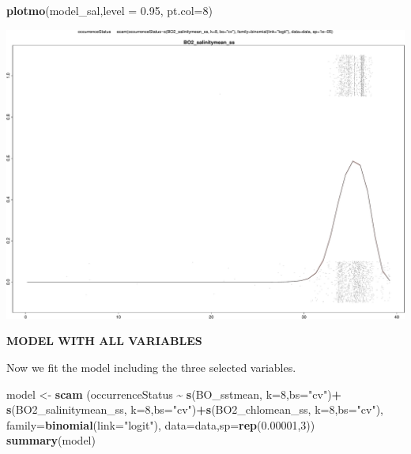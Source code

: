 \documentclass[
]{book}
\newenvironment{Shaded}{\begin{snugshade}}{\end{snugshade}}
\newcommand{\AttributeTok}[1]{\textcolor[rgb]{0.13,0.29,0.53}{#1}}
\newcommand{\DecValTok}[1]{\textcolor[rgb]{0.00,0.00,0.81}{#1}}
\newcommand{\FloatTok}[1]{\textcolor[rgb]{0.00,0.00,0.81}{#1}}
\newcommand{\FunctionTok}[1]{\textcolor[rgb]{0.13,0.29,0.53}{\textbf{#1}}}
\newcommand{\NormalTok}[1]{#1}
\newcommand{\OtherTok}[1]{\textcolor[rgb]{0.56,0.35,0.01}{#1}}
\newcommand{\SpecialCharTok}[1]{\textcolor[rgb]{0.81,0.36,0.00}{\textbf{#1}}}
\newcommand{\StringTok}[1]{\textcolor[rgb]{0.31,0.60,0.02}{#1}}
\begin{document}
\begin{Shaded}
\begin{Highlighting}[]
\FunctionTok{plotmo}\NormalTok{(model\_sal,}\AttributeTok{level =} \FloatTok{0.95}\NormalTok{, }\AttributeTok{pt.col=}\DecValTok{8}\NormalTok{)}
\end{Highlighting}
\end{Shaded}

\includegraphics{_main_files/figure-latex/unnamed-chunk-62-1.pdf}

\textbf{MODEL WITH ALL VARIABLES}

Now we fit the model including the three selected variables.

\begin{Shaded}
\begin{Highlighting}[]
\NormalTok{model }\OtherTok{\textless{}{-}} \FunctionTok{scam}\NormalTok{ (occurrenceStatus }\SpecialCharTok{\textasciitilde{}}  \FunctionTok{s}\NormalTok{(BO\_sstmean, }\AttributeTok{k=}\DecValTok{8}\NormalTok{,}\AttributeTok{bs=}\StringTok{"cv"}\NormalTok{)}\SpecialCharTok{+} \FunctionTok{s}\NormalTok{(BO2\_salinitymean\_ss, }\AttributeTok{k=}\DecValTok{8}\NormalTok{,}\AttributeTok{bs=}\StringTok{"cv"}\NormalTok{)}\SpecialCharTok{+}\FunctionTok{s}\NormalTok{(BO2\_chlomean\_ss, }\AttributeTok{k=}\DecValTok{8}\NormalTok{,}\AttributeTok{bs=}\StringTok{"cv"}\NormalTok{), }\AttributeTok{family=}\FunctionTok{binomial}\NormalTok{(}\AttributeTok{link=}\StringTok{"logit"}\NormalTok{), }\AttributeTok{data=}\NormalTok{data,}\AttributeTok{sp=}\FunctionTok{rep}\NormalTok{(}\FloatTok{0.00001}\NormalTok{,}\DecValTok{3}\NormalTok{))}
\FunctionTok{summary}\NormalTok{(model)}
\end{Highlighting}
\end{Shaded}
\end{document}
